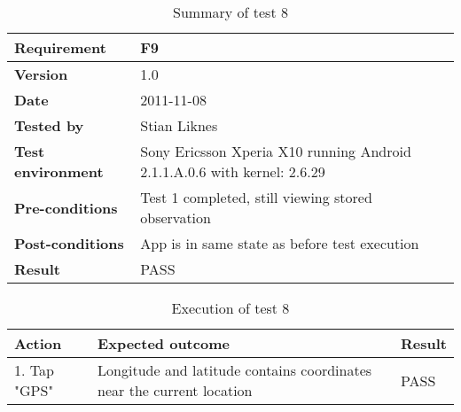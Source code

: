 	\begin{table}[htb]
		\centering
		\begin{tabular}{|p{3.5cm}|p{7.0cm}|} \hline
			\textbf{Requirement} & F9 \\ \hline
			\textbf{Version} & 1.0 \\ \hline
			\textbf{Date} & 2011-11-08 \\ \hline
			\textbf{Tested by} & Stian Liknes \\ \hline
			\textbf{Test environment} & Sony Ericsson Xperia X10 running Android 2.1.1.A.0.6 with kernel: 2.6.29 \\ \hline
			\textbf{Pre-conditions} & Test 1 completed, still viewing stored observation \\ \hline
			\textbf{Post-conditions} & App is in same state as before test execution \\ \hline
			\textbf{Result} & PASS \\ \hline
		\end{tabular}
		\caption{Summary of test 8}
	\end{table}

	\begin{table}[htb]
		\centering
		\begin{tabular}{|p{5.0cm}|p{5.0cm}|p{1cm}|}
			\hline \textbf{Action} & \textbf{Expected outcome} & \textbf{Result} \\ \hline
			
			1. Tap "GPS" &
			Longitude and latitude contains coordinates near the current location &
			PASS \\ \hline

		\end{tabular}
		\caption{Execution of test 8}
	\end{table}

\newpage
